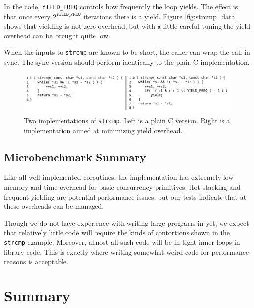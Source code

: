 \documentclass[a4paper,UKenglish,cleveref, autoref]{lipics-v2019}
\begin{document}
In the code, \texttt{YIELD\_FREQ} controls how frequently the loop yields.
The effect is that once every $2^{\mathtt{YIELD\_FREQ}}$ iterations there is a yield.
Figure \ref{fig:strcmp_data} shows that yielding is not zero-overhead, but with a little careful tuning the yield overhead can be brought quite low.

When the inputs to \texttt{strcmp} are known to be short, the caller can wrap the call in sync.
The sync version should perform identically to the plain C implementation.

\begin{figure}
\includegraphics[width=0.99\textwidth]{Code/strcmps}
\caption{Two implementations of \texttt{strcmp}.
  Left is a plain C version.
  Right is a \charcoal{} implementation aimed at minimizing yield overhead.}
\label{fig:strcmp}
\end{figure}


\subsection{Microbenchmark Summary}

Like all well implemented coroutines, the \charcoal{} implementation has extremely low memory and time overhead for basic concurrency primitives.
Hot stacking and frequent yielding are potential performance issues, but our tests indicate that at these overheads can be managed.

Though we do not have experience with writing large programs in \charcoal{} yet, we expect that relatively little code will require the kinds of contortions shown in the \texttt{strcmp} example.
Moreover, almost all such code will be in tight inner loops in library code.
This is exactly where writing somewhat weird code for performance reasons is acceptable.

\section{Summary}
\end{document}
